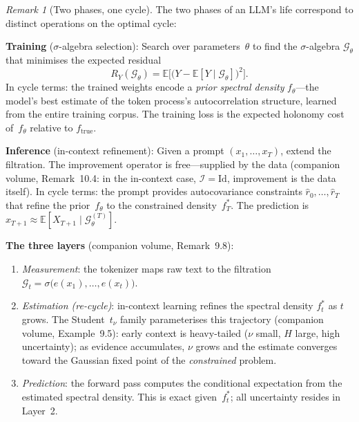 \documentclass[11pt,a4paper]{article}
\theoremstyle{definition}
\theoremstyle{remark}
\newtheorem{remark}[theorem]{Remark}
\begin{document}
\begin{remark}[Two phases, one cycle]
\label{rmk:training-sigma}
The two phases of an LLM's life correspond to distinct operations
on the optimal cycle:

\medskip\noindent\textbf{Training} ($\sigma$-algebra selection):
Search over parameters~$\theta$ to find the $\sigma$-algebra
$\mathcal{G}_\theta$ that minimises the expected residual
\[
  R_Y(\mathcal{G}_\theta) = \mathbb{E}\!\bigl[
  \bigl(Y - \mathbb{E}[Y \mid \mathcal{G}_\theta]\bigr)^2\bigr].
\]
In cycle terms: the trained weights encode a \emph{prior spectral
density} $f_\theta$---the model's best estimate of the token
process's autocorrelation structure, learned from the entire
training corpus.
The training loss is the expected holonomy cost of~$f_\theta$
relative to $f_{\mathrm{true}}$.

\medskip\noindent\textbf{Inference} (in-context refinement):
Given a prompt $(x_1, \ldots, x_T)$, extend the filtration.
The improvement operator is free---supplied by the data
(companion volume, Remark~10.4: in the in-context case,
$\mathcal{I} = \mathrm{Id}$, improvement is the data itself).
In cycle terms: the prompt provides autocovariance constraints
$\hat{r}_0, \ldots, \hat{r}_T$ that refine the prior~$f_\theta$
to the constrained density~$f_T^*$.
The prediction is
$\hat{x}_{T+1} \approx \mathbb{E}[X_{T+1} \mid
\mathcal{G}_\theta^{(T)}]$.

\medskip\noindent\textbf{The three layers}
(companion volume, Remark~9.8):
\begin{enumerate}[nosep]
\item \emph{Measurement}: the tokenizer maps raw text to the
  filtration $\mathcal{G}_t =
  \sigma\!\bigl(e(x_1), \ldots, e(x_t)\bigr)$.
\item \emph{Estimation (re-cycle)}: in-context learning refines
  the spectral density $f_t^*$ as $t$ grows.
  The Student~$t_\nu$ family parameterises this trajectory
  (companion volume, Example~9.5):
  early context is heavy-tailed ($\nu$ small, $H$ large,
  high uncertainty); as evidence accumulates, $\nu$ grows
  and the estimate converges toward the
  Gaussian fixed point of the \emph{constrained} problem.
\item \emph{Prediction}: the forward pass computes the
  conditional expectation from the estimated spectral density.
  This is exact given~$f_t^*$; all uncertainty resides in
  Layer~2.
\end{enumerate}
\end{remark}
\end{document}
